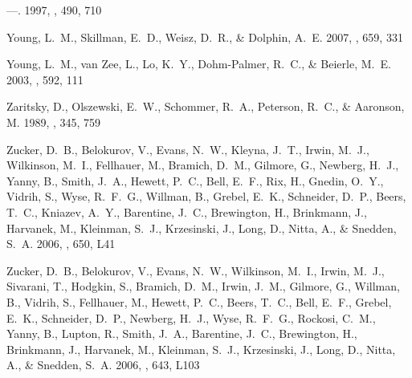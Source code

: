 \documentclass[manuscript]{aastex}
\begin{document}
\begin{thebibliography}{381}
---. 1997{}, \apj, 490, 710

{Young}, L.~M., {Skillman}, E.~D., {Weisz}, D.~R., \& {Dolphin}, A.~E. 2007,
  \apj, 659, 331

{Young}, L.~M., {van Zee}, L., {Lo}, K.~Y., {Dohm-Palmer}, R.~C., \& {Beierle},
  M.~E. 2003, \apj, 592, 111

{Zaritsky}, D., {Olszewski}, E.~W., {Schommer}, R.~A., {Peterson}, R.~C., \&
  {Aaronson}, M. 1989, \apj, 345, 759

{Zucker}, D.~B., {Belokurov}, V., {Evans}, N.~W., {Kleyna}, J.~T., {Irwin},
  M.~J., {Wilkinson}, M.~I., {Fellhauer}, M., {Bramich}, D.~M., {Gilmore}, G.,
  {Newberg}, H.~J., {Yanny}, B., {Smith}, J.~A., {Hewett}, P.~C., {Bell},
  E.~F., {Rix}, H., {Gnedin}, O.~Y., {Vidrih}, S., {Wyse}, R.~F.~G., {Willman},
  B., {Grebel}, E.~K., {Schneider}, D.~P., {Beers}, T.~C., {Kniazev}, A.~Y.,
  {Barentine}, J.~C., {Brewington}, H., {Brinkmann}, J., {Harvanek}, M.,
  {Kleinman}, S.~J., {Krzesinski}, J., {Long}, D., {Nitta}, A., \& {Snedden},
  S.~A. 2006{}, \apjl, 650, L41

{Zucker}, D.~B., {Belokurov}, V., {Evans}, N.~W., {Wilkinson}, M.~I., {Irwin},
  M.~J., {Sivarani}, T., {Hodgkin}, S., {Bramich}, D.~M., {Irwin}, J.~M.,
  {Gilmore}, G., {Willman}, B., {Vidrih}, S., {Fellhauer}, M., {Hewett}, P.~C.,
  {Beers}, T.~C., {Bell}, E.~F., {Grebel}, E.~K., {Schneider}, D.~P.,
  {Newberg}, H.~J., {Wyse}, R.~F.~G., {Rockosi}, C.~M., {Yanny}, B., {Lupton},
  R., {Smith}, J.~A., {Barentine}, J.~C., {Brewington}, H., {Brinkmann}, J.,
  {Harvanek}, M., {Kleinman}, S.~J., {Krzesinski}, J., {Long}, D., {Nitta}, A.,
  \& {Snedden}, S.~A. 2006{}, \apjl, 643, L103


\end{thebibliography}
\end{document}

